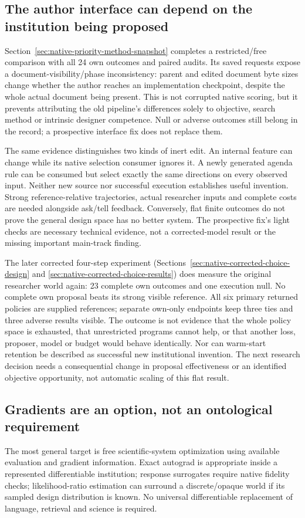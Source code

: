 \subsection{The author interface can depend on the institution being proposed}
Section~\ref{sec:native-priority-method-snapshot} completes a restricted/free
comparison with all 24 own outcomes and paired audits. Its saved requests expose
a document-visibility/phase inconsistency: parent and edited document byte sizes
change whether the author reaches an implementation checkpoint, despite the
whole actual document being present. This is not corrupted native scoring,
but it prevents attributing the old pipeline's differences solely to objective,
search method or intrinsic designer competence. Null or adverse outcomes still
belong in the record; a prospective interface fix does not replace them.

The same evidence distinguishes two kinds of inert edit. An internal feature
can change while its native selection consumer ignores it. A newly generated
agenda rule can be consumed but select exactly the same directions on every
observed input. Neither new source nor successful execution establishes useful
invention. Strong reference-relative trajectories, actual researcher inputs
and complete costs are needed alongside ask/tell feedback. Conversely, flat
finite outcomes do not prove the general design space has no better system.
The prospective fix's light checks are necessary technical evidence, not a
corrected-model result or the missing important main-track finding.

The later corrected four-step experiment
(Sections~\ref{sec:native-corrected-choice-design} and
\ref{sec:native-corrected-choice-results}) does measure the original researcher
world again: 23 complete own outcomes and one execution null. No complete own
proposal beats its strong visible reference. All six primary returned policies
are supplied references; separate own-only endpoints keep three ties and three
adverse results visible. The outcome is not evidence that the whole policy
space is exhausted, that unrestricted programs cannot help, or that another
loss, proposer, model or budget would behave identically. Nor can warm-start
retention be described as successful new institutional invention. The next
research decision needs a consequential change in proposal effectiveness or
an identified objective opportunity, not automatic scaling of this flat result.

\subsection{Gradients are an option, not an ontological requirement}
The most general target is free scientific-system optimization using available
evaluation and gradient information. Exact autograd is appropriate inside a
represented differentiable institution; response surrogates require native
fidelity checks; likelihood-ratio estimation can surround a discrete/opaque
world if its sampled design distribution is known. No universal differentiable
replacement of language, retrieval and science is required.

